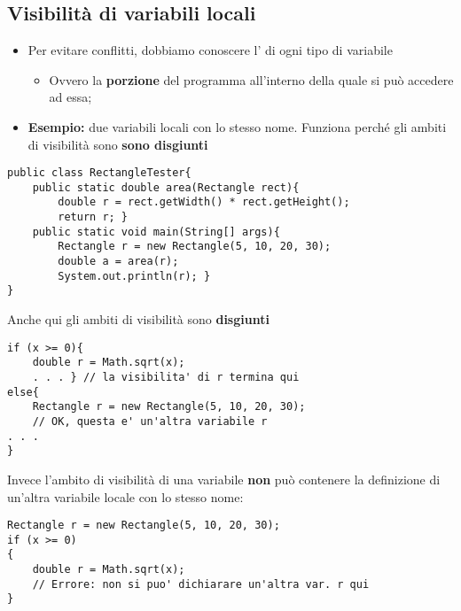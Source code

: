 \subsection*{Visibilità di variabili locali}
\begin{frame}[fragile]
\begin{block}{}
\begin{itemize}
\item Per evitare conflitti, dobbiamo conoscere l'\textbf{} di ogni tipo di variabile
\begin{itemize}
\item Ovvero la \textbf{porzione} del programma all'interno della quale si può accedere ad essa;
\end{itemize}
\item \textbf{Esempio:} due variabili locali con lo stesso nome. Funziona perché gli ambiti di visibilità sono \textbf{\alert{sono
disgiunti}}
\end{itemize}
\end{block}
\begin{lstlisting}
public class RectangleTester{
    public static double area(Rectangle rect){
        double r = rect.getWidth() * rect.getHeight();
        return r; }
    public static void main(String[] args){ 
        Rectangle r = new Rectangle(5, 10, 20, 30);
        double a = area(r);
        System.out.println(r); }
}
\end{lstlisting}
\end{frame}

\begin{frame}[fragile]
Anche qui gli ambiti di visibilità sono \textbf{disgiunti}
\begin{lstlisting}
if (x >= 0){ 
    double r = Math.sqrt(x);
    . . . } // la visibilita' di r termina qui
else{ 
    Rectangle r = new Rectangle(5, 10, 20, 30);
    // OK, questa e' un'altra variabile r
. . . 
}
\end{lstlisting}
Invece l'ambito di visibilità di una variabile \textbf{non} può contenere la definizione di un'altra variabile locale con lo stesso 
nome:
\begin{lstlisting}
Rectangle r = new Rectangle(5, 10, 20, 30);
if (x >= 0)
{ 
    double r = Math.sqrt(x);
    // Errore: non si puo' dichiarare un'altra var. r qui
}
\end{lstlisting}
\end{frame}

